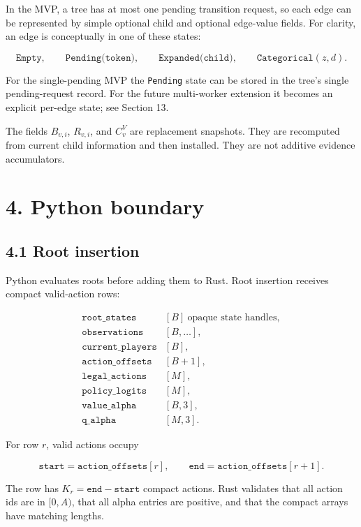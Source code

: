 \documentclass[11pt]{article}
\begin{document}
In the MVP, a tree has at most one pending transition request, so each edge can
be represented by simple optional child and optional edge-value fields. For
clarity, an edge is conceptually in one of these states:

\[
\texttt{Empty},
\qquad
\texttt{Pending(token)},
\qquad
\texttt{Expanded(child)},
\qquad
\texttt{Categorical}(z,d).
\]

For the single-pending MVP the \texttt{Pending} state can be stored in the tree's
single pending-request record. For the future multi-worker extension it becomes
an explicit per-edge state; see Section 13.

The fields \(B_{v,i}\), \(R_{v,i}\), and \(C^V_v\) are replacement snapshots.
They are recomputed from current child information and then installed. They are
not additive evidence accumulators.

\section*{4. Python boundary}

\subsection*{4.1 Root insertion}

Python evaluates roots before adding them to Rust. Root insertion receives
compact valid-action rows:

\[
\begin{array}{ll}
\texttt{root\_states}       & [B]\ \text{opaque state handles},\\
\texttt{observations}       & [B,\ldots],\\
\texttt{current\_players}   & [B],\\
\texttt{action\_offsets}    & [B+1],\\
\texttt{legal\_actions}     & [M],\\
\texttt{policy\_logits}     & [M],\\
\texttt{value\_alpha}       & [B,3],\\
\texttt{q\_alpha}           & [M,3].
\end{array}
\]

For row \(r\), valid actions occupy

\[
\texttt{start}=\texttt{action\_offsets}[r],
\qquad
\texttt{end}=\texttt{action\_offsets}[r+1].
\]

The row has \(K_r=\texttt{end}-\texttt{start}\) compact actions. Rust validates
that all action ids are in \([0,A)\), that all alpha entries are positive, and
that the compact arrays have matching lengths.
\end{document}
